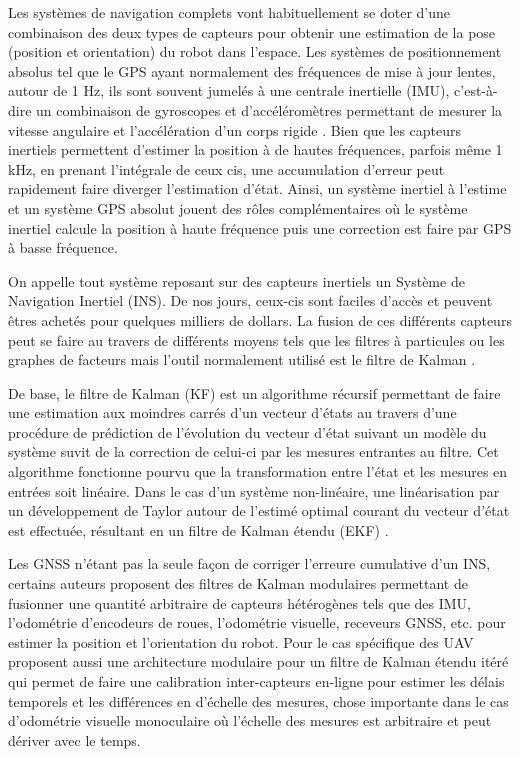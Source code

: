Les systèmes de navigation complets vont habituellement se doter d'une combinaison des deux types de capteurs pour obtenir une estimation de la pose (position et orientation) du robot dans l'espace. Les systèmes de positionnement absolus tel que le GPS ayant normalement des fréquences de mise à jour lentes, autour de 1 Hz, ils sont souvent jumelés à une centrale inertielle (IMU), c'est-à-dire un combinaison de gyroscopes et d'accéléromètres permettant de mesurer la vitesse angulaire et l'accélération d'un corps rigide \citep{Noureldin2013}. Bien que les capteurs inertiels permettent d'estimer la position à de hautes fréquences, parfois même 1 kHz, en prenant l'intégrale de ceux cis, une accumulation d'erreur peut rapidement faire diverger l'estimation d'état. Ainsi, un système inertiel à l'estime et un système GPS absolut jouent des rôles complémentaires où le système inertiel calcule la position à haute fréquence puis une correction est faire par GPS à basse fréquence.

On appelle tout système reposant sur des capteurs inertiels un Système de Navigation Inertiel (INS). De nos jours, ceux-cis sont faciles d'accès et peuvent êtres achetés pour quelques milliers de dollars. La fusion de ces différents capteurs peut se faire au travers de différents moyens tels que les filtres à particules \citep{Carvalho1997} ou les graphes de facteurs \citep{Indelman2012} mais l'outil normalement utilisé est le filtre de Kalman \citep{Noureldin2013}.

De base, le filtre de Kalman (KF) est un algorithme récursif permettant de faire une estimation aux moindres carrés d'un vecteur d'états au travers d'une procédure de prédiction de l'évolution du vecteur d'état suivant un modèle du système suvit de la correction de celui-ci par les mesures entrantes au filtre. Cet algorithme fonctionne pourvu que la transformation entre l'état et les mesures en entrées soit linéaire. Dans le cas d'un système non-linéaire, une linéarisation par un développement de Taylor autour de l'estimé optimal courant du vecteur d'état est effectuée, résultant en un filtre de Kalman étendu (EKF) \citep{Chui2017}.

Les GNSS n'étant pas la seule façon de corriger l'erreure cumulative d'un INS, certains auteurs proposent des filtres de Kalman modulaires permettant de fusionner une quantité arbitraire de capteurs hétérogènes tels que des IMU, l'odométrie d'encodeurs de roues, l'odométrie visuelle, receveurs GNSS, etc. \citep{MooreEkf2014} pour estimer la position et l'orientation du robot. Pour le cas spécifique des UAV \citep{Lynen2013} proposent aussi une architecture modulaire pour un filtre de Kalman étendu itéré qui permet de faire une calibration inter-capteurs en-ligne pour estimer les délais temporels et les différences en d'échelle des mesures, chose importante dans le cas d'odométrie visuelle monoculaire où l'échelle des mesures est arbitraire et peut dériver avec le temps.

